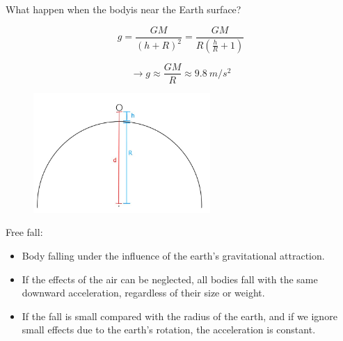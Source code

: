 \documentclass[]{beamer}
\begin{document}


\begin{frame}
   What happen when the bodyis near the Earth surface? 
    \pause
    
    \vspace{3mm}

        \begin{equation*}
            g=\frac{GM}{(h+R)^2}=\frac{GM}{R(\frac{h}{R}+1)}
        \end{equation*}

        \begin{equation*}
         \rightarrow   g\approx\frac{GM}{R}\approx9.8~m/s^2
        \end{equation*}

        \begin{figure}[h!]  
            \includegraphics[width=0.6\textwidth]{images/6.jpg}
            
          \end{figure}
     
    \end{frame}


\begin{frame}
    Free fall:
    \vspace{3mm}
\begin{itemize}
\item  Body falling under the influence of the earth’s gravitational attraction.
\pause
\item  If the effects of the air can be neglected, all bodies fall with the 
same downward acceleration, regardless of their size or weight.
\pause 
\item If  the fall is small compared with the radius of the earth, and if we ignore small effects due to the
earth’s rotation, the acceleration is constant.
\end{itemize}
 
    

\end{frame}
\end{document}

